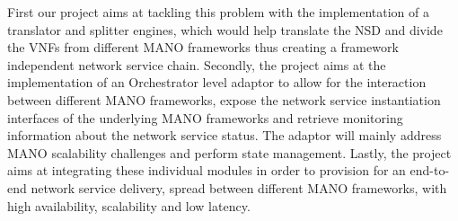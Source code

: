First our project aims at tackling this problem with the implementation of a translator and splitter engines, which would help translate the NSD and divide the VNFs from different MANO frameworks thus creating a framework independent network service chain. Secondly, the project aims at the implementation of an Orchestrator level adaptor to allow for the interaction between different MANO frameworks, expose the network service instantiation interfaces of the underlying MANO frameworks and retrieve monitoring information about the network service status. The adaptor will mainly address MANO scalability challenges and perform state management. Lastly, the project aims at integrating these individual modules in order to provision for an end-to-end network service delivery, spread between different MANO frameworks, with high availability, scalability and low latency.


